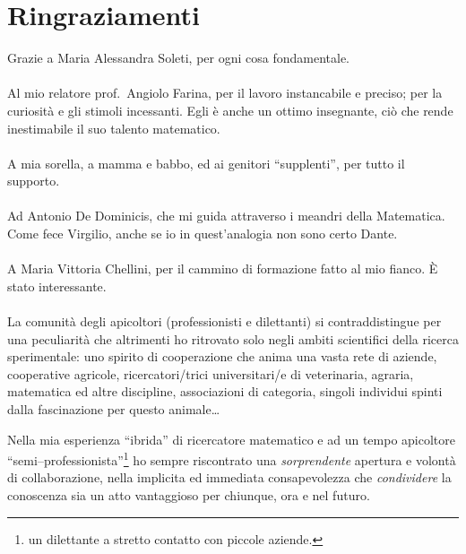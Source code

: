 \cleardoublepage
{} %
\section*{Ringraziamenti}
Grazie a Maria Alessandra Soleti, per ogni cosa fondamentale.

\paragraph{}
Al mio relatore prof.~Angiolo Farina, per il lavoro instancabile e preciso; per la curiosità e gli stimoli incessanti.
Egli è anche un ottimo insegnante, ciò che rende inestimabile il suo talento matematico.

\paragraph{}
A mia sorella, a mamma e babbo, ed ai genitori ``supplenti'', per tutto il supporto.

\paragraph{}
Ad Antonio De Dominicis, che mi guida attraverso i meandri della Matematica.
Come fece Virgilio, anche se io in quest'analogia non sono certo Dante.

\paragraph{}
A Maria Vittoria Chellini, per il cammino di formazione fatto al mio fianco. È stato interessante.

\paragraph{}
La comunità degli apicoltori (professionisti e dilettanti) si contraddistingue per una peculiarità
che altrimenti ho ritrovato solo negli ambiti scientifici della ricerca sperimentale: uno spirito di cooperazione
che anima una vasta rete di aziende, cooperative agricole, ricercatori/trici universitari/e di veterinaria, agraria,
matematica ed altre discipline, associazioni di categoria, singoli individui spinti dalla fascinazione per
questo animale\dots

Nella mia esperienza ``ibrida'' di ricercatore matematico e ad un tempo
apicoltore ``semi--professionista''\footnote{\ie un dilettante a stretto contatto con piccole aziende.}
ho sempre riscontrato una \emph{sorprendente} apertura e volontà di collaborazione, nella implicita ed immediata
consapevolezza che \emph{condividere} la conoscenza sia un atto vantaggioso per chiunque, ora e nel futuro.

